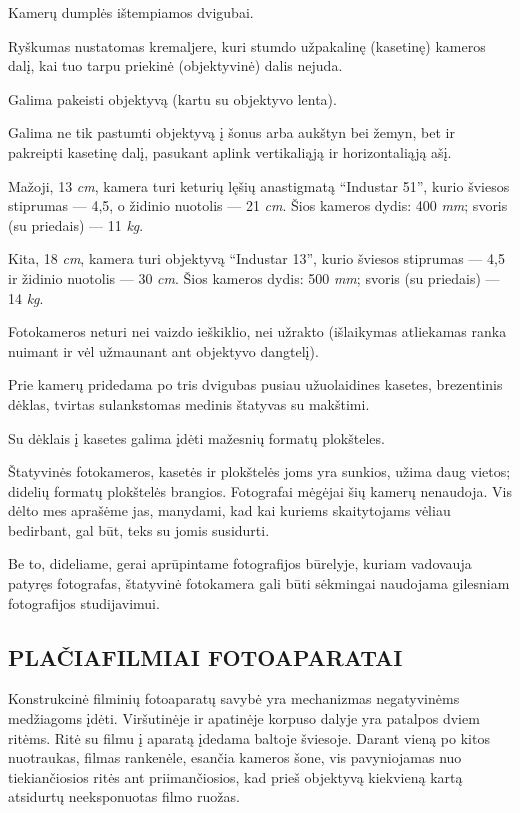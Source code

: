 \documentclass[12pt]{book}
\begin{document}
			Kamerų dumplės ištempiamos dvigubai.

			Ryškumas nustatomas kremaljere, kuri stumdo užpakalinę (kasetinę) kameros dalį, kai tuo tarpu priekinė (objektyvinė) dalis nejuda.

			Galima pakeisti objektyvą (kartu su objektyvo lenta).

			Galima ne tik pastumti objektyvą į šonus arba aukštyn bei žemyn, bet ir pakreipti kasetinę dalį, pasukant aplink vertikaliąją ir horizontaliąją ašį.

			Mažoji, 13  \textit{cm}, kamera turi keturių lęšių anastigmatą ``Industar 51'', kurio šviesos stiprumas --- 4,5, o židinio nuotolis --- 21 \textit{cm}. Šios kameros dydis: 400   \textit{mm}; svoris (su priedais) --- 11 \textit{kg}.

			Kita, 18  \textit{cm}, kamera turi objektyvą ``Industar 13'', kurio šviesos stiprumas --- 4,5 ir židinio nuotolis --- 30 \textit{cm}. Šios kameros dydis: 500   \textit{mm}; svoris (su priedais) --- 14 \textit{kg}.

			Fotokameros neturi nei vaizdo ieškiklio, nei užrakto (išlaikymas atliekamas ranka nuimant ir vėl užmaunant ant objektyvo dangtelį).

			Prie kamerų pridedama po tris dvigubas pusiau užuolaidines kasetes, brezentinis dėklas, tvirtas sulankstomas medinis štatyvas su makštimi.

			Su dėklais į kasetes galima įdėti mažesnių formatų plokšteles.

			Štatyvinės fotokameros, kasetės ir plokštelės joms yra sunkios, užima daug vietos; didelių formatų plokštelės brangios. Fotografai mėgėjai šių kamerų nenaudoja. Vis dėlto mes aprašėme jas, manydami, kad kai kuriems skaitytojams vėliau bedirbant, gal būt, teks su jomis susidurti.

			Be to, dideliame, gerai aprūpintame fotografijos būrelyje, kuriam vadovauja patyręs fotografas, štatyvinė fotokamera gali būti sėkmingai naudojama gilesniam fotografijos studijavimui.
		\subsection*{PLAČIAFILMIAI FOTOAPARATAI}
			Konstrukcinė filminių fotoaparatų savybė yra mechanizmas negatyvinėms medžiagoms įdėti. Viršutinėje ir apatinėje korpuso dalyje yra patalpos dviem ritėms. Ritė su filmu į aparatą įdedama baltoje šviesoje. Darant vieną po kitos nuotraukas, filmas rankenėle, esančia kameros šone, vis pavyniojamas nuo tiekiančiosios ritės ant priimančiosios, kad prieš objektyvą kiekvieną kartą atsidurtų neeksponuotas filmo ruožas.
\end{document}
